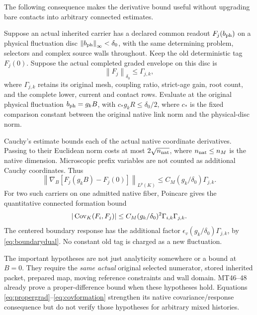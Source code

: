 \documentclass[11pt,letterpaper]{article}
\theoremstyle{remark}\newtheorem{remark}[theorem]{Remark}
\newcommand{\norm}[1]{\left\lVert#1\right\rVert}
\begin{document}
The following consequence makes the derivative bound useful without upgrading bare contacts into arbitrary connected estimates.

Suppose an actual inherited carrier has a declared common readout
$F_j(b_{\rm ph})$ on a physical fluctuation disc
$\norm{b_{\rm ph}}_\infty<\delta_0$, with the same determining problem, selectors and complex source walls throughout. Keep the old deterministic tag $F_j(0)$. Suppose the actual completed graded envelope on this disc is
\[
 \norm{F_j}_{\delta_0}\le \Gamma_{j,k},
\]
where $\Gamma_{j,k}$ retains its original mesh, coupling ratio, strict-age gain, root count, and the complete lower, current and contact rows. Evaluate at the original physical fluctuation $b_{\rm ph}=g_kB$, with $c_*g_kR\le\delta_0/2$, where $c_*$ is the fixed comparison constant between the original native link norm and the physical-disc norm.

Cauchy's estimate bounds each of the actual native coordinate derivatives. Passing to their Euclidean norm costs at most $2\sqrt{n_{\rm nat}}$, where $n_{\rm nat}\le n_M$ is the native dimension. Microscopic prefix variables are not counted as additional Cauchy coordinates. Thus
\begin{equation}\label{eq:propergrad}
 \norm{\nabla_B[F_j(g_kB)-F_j(0)]}_{L^p(K)}
 \le C_M(g_k/\delta_0)\Gamma_{j,k}.
\end{equation}
For two such carriers on one admitted native fiber, Poincare gives the quantitative connected formation bound
\begin{equation}\label{eq:covformation}
 |\operatorname{Cov}_K(F_i,F_j)|
 \le C_M(g_k/\delta_0)^2\Gamma_{i,k}\Gamma_{j,k}.
\end{equation}
The centered boundary response has the additional factor
$\epsilon_v(g_k/\delta_0)\Gamma_{j,k}$, by \eqref{eq:boundarydual}.
No constant old tag is charged as a new fluctuation.

The important hypotheses are not just analyticity somewhere or a bound at $B=0$. They require the \emph{same actual} original selected numerator, stored inherited packet, prepared map, moving reference constraints and wall domain. MT46--48 already prove a proper-difference bound when these hypotheses hold. Equations \eqref{eq:propergrad}--\eqref{eq:covformation} strengthen its native covariance/response consequence but do not verify those hypotheses for arbitrary mixed histories.
\end{document}
